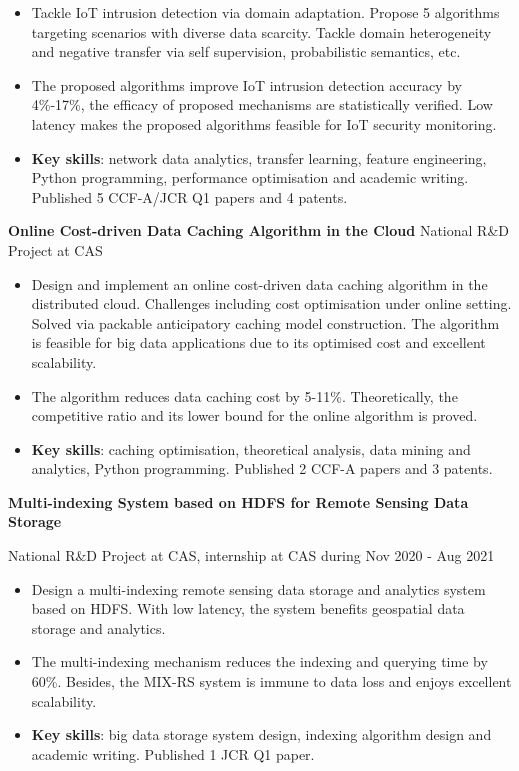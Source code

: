\documentclass[letterpaper,10.9pt]{article}
\begin{document}
\begin{itemize}
  \setlength\itemsep{1.8pt}
  \item Tackle IoT intrusion detection via domain adaptation. Propose 5 algorithms targeting scenarios with diverse data scarcity. Tackle domain heterogeneity and negative transfer via self supervision, probabilistic semantics, etc. 
  \item The proposed algorithms improve IoT intrusion detection accuracy by 4\%-17\%, the efficacy of proposed mechanisms are statistically verified. Low latency makes the proposed algorithms feasible for IoT security monitoring. 
  \item \textbf{Key skills}: network data analytics, transfer learning, feature engineering, Python programming, performance optimisation and academic writing. Published 5 CCF-A/JCR Q1 papers and 4 patents. 
\end{itemize}

\vspace{1pt}

\textbf{Online Cost-driven Data Caching Algorithm in the Cloud} \hfill National R\&D Project at CAS

\begin{itemize}
  \setlength\itemsep{1.8pt}
  \item Design and implement an online cost-driven data caching algorithm in the distributed cloud. Challenges including cost optimisation under online setting. Solved via packable anticipatory caching model construction. The algorithm is feasible for big data applications due to its optimised cost and excellent scalability. 
  \item The algorithm reduces data caching cost by 5-11\%. Theoretically, the competitive ratio and its lower bound for the online algorithm is proved. 
  \item \textbf{Key skills}: caching optimisation, theoretical analysis, data mining and analytics, Python programming. Published 2 CCF-A papers and 3 patents. 
\end{itemize}

\vspace{1pt}

\textbf{Multi-indexing System based on HDFS for Remote Sensing Data Storage} 

National R\&D Project at CAS, internship at CAS during Nov 2020 - Aug 2021

\begin{itemize}
  \setlength\itemsep{1.8pt}
  \item Design a multi-indexing remote sensing data storage and analytics system based on HDFS. With low latency, the system benefits geospatial data storage and analytics. 
  \item The multi-indexing mechanism reduces the indexing and querying time by 60\%. Besides, the MIX-RS system is immune to data loss and enjoys excellent scalability.
  \item \textbf{Key skills}: big data storage system design, indexing algorithm design and academic writing. Published 1 JCR Q1 paper. 
\end{itemize}
\end{document}
